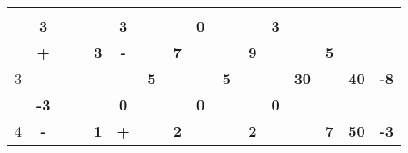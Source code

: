 \documentclass[a4paper, 12pt]{article}
\begin{document}
\begin{table}[H]
\begin{tabular}{|c|cccc|cccc|cccc|cccc|rr|}
          &       & \multicolumn{2}{c}{} &       &       & \multicolumn{2}{c}{} &       &       & \multicolumn{2}{c}{} &       &       & \multicolumn{2}{c}{} &       & \multicolumn{1}{c|}{} &  \bigstrut[b]\\
\cline{2-2}\cline{6-6}\cline{10-10}\cline{14-14}          & \multicolumn{1}{c|}{\textbf{3}} &       &       &       & \multicolumn{1}{c|}{\textbf{3}} &       &       &       & \multicolumn{1}{c|}{\textbf{0}} &       &       &       & \multicolumn{1}{c|}{\textbf{3}} & \multicolumn{2}{c}{} &       & \multicolumn{1}{c|}{} &  \bigstrut\\
    \hline
    \multirow{4}[6]{*}{3} & \multicolumn{1}{c|}{\cellcolor[rgb]{ 1,  0,  0}\textbf{+}} &       & \multicolumn{1}{r|}{} & \cellcolor[rgb]{ 1,  1,  0}\textbf{3} & \multicolumn{1}{c|}{\cellcolor[rgb]{ 1,  0,  0}\textbf{-}} &       & \multicolumn{1}{r|}{} & \cellcolor[rgb]{ 0,  .69,  .314}\textbf{7} &       & \multicolumn{2}{c|}{} & \cellcolor[rgb]{ 1,  .753,  0}\textbf{9} &       &       & \multicolumn{1}{r|}{} & \cellcolor[rgb]{ 1,  .753,  0}\textbf{5} & \multicolumn{1}{c|}{\multirow{4}[6]{*}{\textbf{40}}} & \multicolumn{1}{c|}{\multirow{4}[6]{*}{\textbf{-8}}} \bigstrut\\
\cline{2-2}\cline{5-6}\cline{9-9}\cline{13-13}\cline{17-17}          &       & \multicolumn{2}{c}{\multirow{2}[2]{*}{}} &       &       & \multicolumn{2}{c}{\multirow{2}[2]{*}{\textbf{5}}} & \multirow{3}[4]{*}{} &       & \multicolumn{2}{c}{\multirow{2}[2]{*}{\textbf{5}}} &       &       & \multicolumn{2}{c}{\multirow{2}[2]{*}{\textbf{30}}} &       & \multicolumn{1}{c|}{} &  \bigstrut[t]\\
          &       & \multicolumn{2}{c}{} &       &       & \multicolumn{2}{c}{} &       &       & \multicolumn{2}{c}{} &       &       & \multicolumn{2}{c}{} &       & \multicolumn{1}{c|}{} &  \bigstrut[b]\\
\cline{2-2}\cline{6-6}\cline{10-10}\cline{14-14}          & \multicolumn{1}{c|}{\textbf{-3}} & \multicolumn{2}{c}{} &       & \multicolumn{1}{c|}{\textbf{0}} & \multicolumn{2}{c}{} &       & \multicolumn{1}{c|}{\textbf{0}} &       &       &       & \multicolumn{1}{c|}{\textbf{0}} & \multicolumn{2}{c}{} &       & \multicolumn{1}{c|}{} &  \bigstrut\\
    \hline
    \multirow{4}[6]{*}{4} & \multicolumn{1}{c|}{\cellcolor[rgb]{ 1,  0,  0}\textbf{-}} &       & \multicolumn{1}{r|}{} & \cellcolor[rgb]{ 0,  .69,  .314}\textbf{1} & \multicolumn{1}{c|}{\cellcolor[rgb]{ 1,  0,  0}\textbf{+}} &       & \multicolumn{1}{r|}{} & \cellcolor[rgb]{ 0,  .69,  .314}\textbf{2} &       &       & \multicolumn{1}{r|}{} & \textbf{2} &       &       & \multicolumn{1}{r|}{} & \textbf{7} & \multicolumn{1}{c|}{\multirow{4}[6]{*}{\textbf{50}}} & \multicolumn{1}{c|}{\multirow{4}[6]{*}{\textbf{-3}}} \bigstrut\\

\end{tabular}
\end{table}
\end{document}
